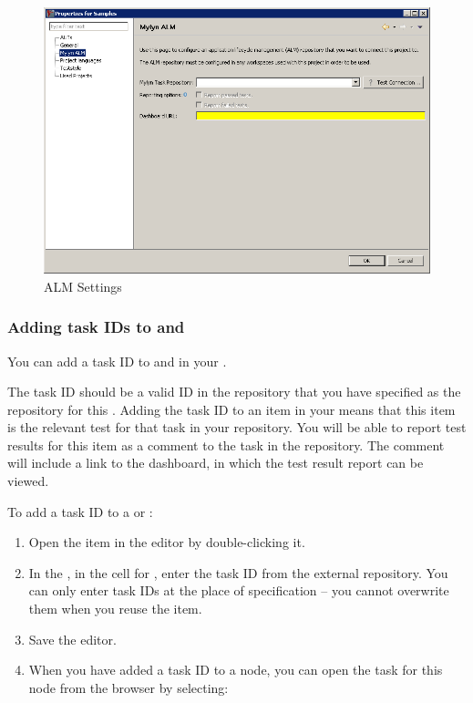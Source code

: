 \begin{figure}[h]
\begin{center}
\includegraphics[width=12.5cm]{Tasks/ALM/PS/almproperties}
\caption{ALM Settings}
\label{TasksALMProjectProperties}
\end{center}
\end{figure}



\subsubsection{Adding task IDs to \gdsuites{} and \gdcases{}}
\label{TasksALMAddTask}

You can add a task ID to \gdcases{} and \gdsuites{} in your \gdproject{}. 

The task ID should be a valid ID in the repository that you have specified as the repository for this \gdproject{} . Adding the task ID to an item in your \gdproject{} means that this item is the relevant test for that task in your repository. You will be able to report test results for this item as a comment to the task in the repository. The comment will include a link to the dashboard, in which the test result report can be viewed.

To add a task ID to a \gdcase{} or \gdsuite{}:
\begin{enumerate}
\item Open the item in the editor by double-clicking it.
\item In the \gdpropview{}, in the cell for , enter the task ID from the external repository. You can only enter task IDs at the place of specification -- you cannot overwrite them when you reuse the item.
\item Save the editor. 
\item When you have added a task ID to a node, you can open the task for this node from the browser by selecting:\\
\end{enumerate}

